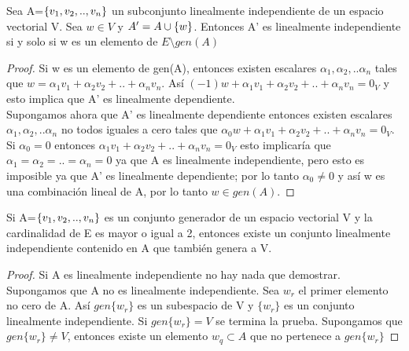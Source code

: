 
%
%

\begin{theorem}
Sea A=$ \left\{v_1, v_2, .., v_n \right\} $ un subconjunto linealmente independiente de un espacio vectorial V. Sea $w\in V$ y $A'=A\cup \left\{w \right\} $. Entonces A' es linealmente independiente si y solo si w es un elemento de $E\setminus gen(A)$
\end{theorem}

\begin{proof}
Si w es un elemento de gen(A), entonces existen escalares $\alpha_1, \alpha_2, ..\alpha_n$ tales que $w=\alpha_1v_1+\alpha_2v_2+..+\alpha_nv_n$. Así $(-1)w+\alpha_1v_1+\alpha_2v_2+..+\alpha_nv_n=0_V$ y esto implica que A' es linealmente dependiente.\\
Supongamos ahora que A' es linealmente dependiente entonces existen escalares  $\alpha_1, \alpha_2, ..\alpha_n$ no todos iguales a cero tales que $\alpha_0w+\alpha_1v_1+\alpha_2v_2+..+\alpha_nv_n=0_V$. Si $\alpha_0=0$ entonces $\alpha_1v_1+\alpha_2v_2+..+\alpha_nv_n=0_V$ esto implicaría que $\alpha_1= \alpha_2= ..=\alpha_n=0$ ya que A es linealmente independiente, pero esto es imposible ya que A' es linealmente dependiente; por lo tanto $\alpha_0\neq0$ y así w es una combinación lineal de A, por lo tanto $w\in gen(A)$.
\end{proof}
\begin{theorem}
Si  A=$ \left\{v_1, v_2, .., v_n \right\} $ es un conjunto generador de un espacio vectorial V y la cardinalidad de E es mayor o igual a 2, entonces existe un conjunto linealmente independiente contenido en A que también genera a V.
\end{theorem}
\begin{proof}
Si A es linealmente independiente no hay nada que demostrar. Supongamos que A no es linealmente independiente. Sea $w_r$ el primer elemento no cero de A. Así $gen\{w_r\}$ es un subespacio de V y $\{w_r\}$ es un conjunto linealmente independiente. Si $gen\{w_r\}=V$ se termina la prueba. Supongamos que $gen\{w_r\}\neq V$, entonces existe un elemento $w_q\subset A$ que no pertenece a $gen\{w_r\}$
\end{proof}